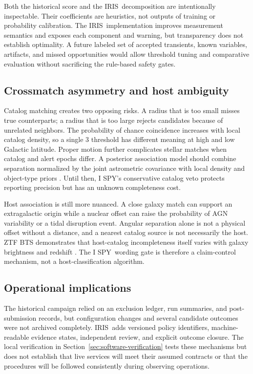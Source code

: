 \documentclass[11pt]{article}
\newcommand{\project}{I SPY}
\newcommand{\iris}{IRIS}
\begin{document}
Both the historical score and the \iris\ decomposition are intentionally inspectable. Their coefficients are heuristics, not outputs of training or probability calibration. The \iris\ implementation improves measurement semantics and exposes each component and warning, but transparency does not establish optimality. A future labeled set of accepted transients, known variables, artifacts, and missed opportunities would allow threshold tuning and comparative evaluation without sacrificing the rule-based safety gates.

\subsection{Crossmatch asymmetry and host ambiguity}

Catalog matching creates two opposing risks. A radius that is too small misses true counterparts; a radius that is too large rejects candidates because of unrelated neighbors. The probability of chance coincidence increases with local catalog density, so a single \SI{3}{\arcsec} threshold has different meaning at high and low Galactic latitude. Proper motion further complicates stellar matches when catalog and alert epochs differ. A posterior association model should combine separation normalized by the joint astrometric covariance with local density and object-type priors \citep{budavari2008}. Until then, \project's conservative catalog veto protects reporting precision but has an unknown completeness cost.

Host association is still more nuanced. A close galaxy match can support an extragalactic origin while a nuclear offset can raise the probability of AGN variability or a tidal disruption event. Angular separation alone is not a physical offset without a distance, and a nearest catalog source is not necessarily the host. ZTF BTS demonstrates that host-catalog incompleteness itself varies with galaxy brightness and redshift \citep{fremling2020}. The \project\ wording gate is therefore a claim-control mechanism, not a host-classification algorithm.

\subsection{Operational implications}

The historical campaign relied on an exclusion ledger, run summaries, and post-submission records, but configuration changes and several candidate outcomes were not archived completely. \iris\ adds versioned policy identifiers, machine-readable evidence states, independent review, and explicit outcome closure. The local verification in Section~\ref{sec:software-verification} tests these mechanisms but does not establish that live services will meet their assumed contracts or that the procedures will be followed consistently during observing operations.
\end{document}
